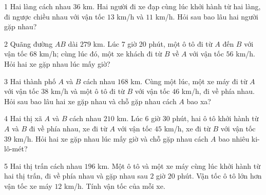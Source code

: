 \begin{probbox}{1}{\relax}
Hai làng cách nhau $36$ km. Hai người đi xe đạp cùng lúc khởi hành từ hai làng, đi ngược chiều nhau với vận tốc $13$ km/h và $11$ km/h. Hỏi sau bao lâu hai người gặp nhau?
\end{probbox}
\gap
\begin{probbox}{2}{\relax}
Quãng đường $AB$ dài $279$ km. Lúc 7 giờ 20 phút, một ô tô đi từ $A$ đến $B$ với vận tốc $68$ km/h; cùng lúc đó, một xe khách đi từ $B$ về $A$ với vận tốc $56$ km/h. Hỏi hai xe gặp nhau lúc mấy giờ?
\end{probbox}
\gap
\begin{probbox}{3}{\relax}
Hai thành phố $A$ và $B$ cách nhau $168$ km. Cùng một lúc, một xe máy đi từ $A$ với vận tốc $38$ km/h và một ô tô đi từ $B$ với vận tốc $46$ km/h, đi về phía nhau. Hỏi sau bao lâu hai xe gặp nhau và chỗ gặp nhau cách $A$ bao xa?
\end{probbox}
\gap
\begin{probbox}{4}{\relax}
Hai thị xã $A$ và $B$ cách nhau $210$ km. Lúc 6 giờ 30 phút, hai ô tô khởi hành từ $A$ và $B$ đi về phía nhau, xe đi từ $A$ với vận tốc $45$ km/h, xe đi từ $B$ với vận tốc $39$ km/h. Hỏi hai xe gặp nhau lúc mấy giờ và chỗ gặp nhau cách $A$ bao nhiêu ki-lô-mét?
\end{probbox}
\gap
\begin{probbox}{5}{\relax}
Hai thị trấn cách nhau $196$ km. Một ô tô và một xe máy cùng lúc khởi hành từ hai thị trấn, đi về phía nhau và gặp nhau sau $2$ giờ $20$ phút. Vận tốc ô tô lớn hơn vận tốc xe máy $12$ km/h. Tính vận tốc của mỗi xe.
\end{probbox}
